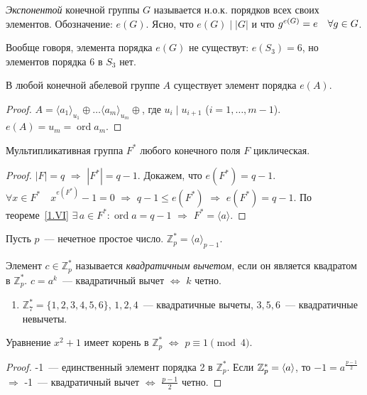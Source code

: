 \documentclass[a4paper]{article}
\newcommand{\ord}{\mathop{\mathrm{ord}}\nolimits}
\newcommand*{\p}[1]{#1\nobreak\discretionary{}{\hbox{$\mathsurround=0pt #1$}}{}}
\begin{document}
\emph{Экспонентой} конечной группы $G$ называется н.о.к. порядков
всех своих элементов. Обозначение: $e(G)$. Ясно, что $e(G)\mid|G|$ и
что $g^{e(G)}\p=e\quad\forall g\in G$.

Вообще говоря, элемента порядка $e(G)$ не существут: $e(S_3)=6$, но
элементов порядка 6 в $S_3$ нет.

\begin{theorem}
\label{1.VI}В любой конечной абелевой группе $A$ существует элемент
порядка $e(A)$.
\end{theorem}

\begin{proof}
$A=\langle a_1\rangle_{u_1}\oplus\ldots\langle
a_m\rangle_{u_m}\oplus$, где $u_i\mid u_{i+1}$ ($i=1,\ldots,m-1$).
$e(A)=u_m=\ord a_m$.
\end{proof}

\begin{theorem}
Мультипликативная группа $F^*$ любого конечного поля $F$
циклическая.
\end{theorem}

\begin{proof}
$|F|=q$ $\Rightarrow$ $|F^*|=q-1$. Докажем, что $e(F^*)=q-1$.
$\forall x\in F^*\quad x^{e(F^*)}-1=0$ $\Rightarrow$ $q-1\leqslant
e(F^*)$ $\Rightarrow$ $e(F^*)=q-1$. По теореме~\ref{1.VI} $\exists
\, a\in F^*: \ord a=q-1$ $\Rightarrow$ $F^*=\langle a\rangle$.
\end{proof}

Пусть $p$~--- нечетное простое число. $\mathbb{Z}^*_p=\langle
a\rangle_{p-1}$.

Элемент $c\in\mathbb{Z}^*_{p}$ называется \emph{квадратичным
вычетом}, если он является квадратом в $\mathbb{Z}^*_p$. $c=a^k$~---
квадратичный вычет $\Leftrightarrow$ $k$ четно.

\prim
\begin{enumerate}
  \item $\mathbb{Z}^*_7=\{1,2,3,4,5,6\}$, $1,2,4$~--- квадратичные
  вычеты, $3, 5, 6$~--- квадратичные невычеты.
\end{enumerate}

\begin{theorem}
Уравнение $x^2+1$ имеет корень в $\mathbb{Z}^*_p$ $\Leftrightarrow$
$p\equiv 1\pmod{4}$.
\end{theorem}

\begin{proof}
-1~--- единственный элемент порядка 2 в $\mathbb{Z}^*_p$. Если
$\mathbb{Z}^*_p\p=\langle a\rangle$, то $-1=a^{\frac{p-1}{2}}$
$\Rightarrow$ -1~--- квадратичный вычет $\Leftrightarrow$
$\frac{p-1}{2}$ четно.
\end{proof}
\end{document}
